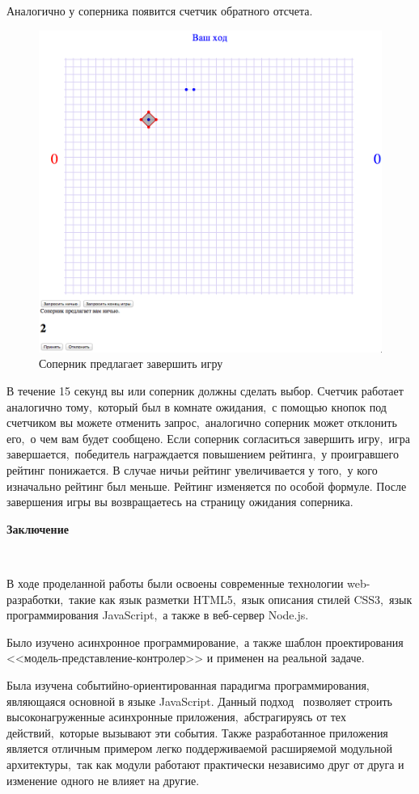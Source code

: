 \documentclass[14pt,a4paper]{report}
\makeatletter
\newcommand{\prechapterheading}[1]{
	\clearpage
	\phantomsection
    \textbf{#1}
    \\
}
\newif\if@prechapterused
\newcommand{\prechapter}[1]{
    \prechapterheading{#1}
    \@prechapterusedtrue
    \addcontentsline{toc}{chapter}{#1}
}
\let\oldchapter\chapter
\renewcommand{\chapter}[1]
{
\if@prechapterused\vspace{-2em}\@prechapterusedfalse\fi
\begingroup
	\let\clearpage\relax
	\let\cleardoublepage\relax
	\oldchapter{#1}
\endgroup
}
\makeatother
\begin{document}
Аналогично у соперника появится счетчик обратного отсчета.
\begin{figure}[H]
\centerline{\includegraphics[scale=0.5]{gfx/17_game_accepting.png}}
\caption{Соперник предлагает завершить игру}
\label{fig:game_accepting}
\end{figure}
В течение 15 секунд вы или соперник должны сделать выбор. Счетчик работает аналогично тому,~который был в комнате ожидания,~с помощью кнопок под счетчиком вы можете отменить запрос,~аналогично соперник может отклонить его,~о чем вам будет сообщено. Если соперник согласиться завершить игру,~игра завершается,~победитель награждается повышением рейтинга,~у проигравшего рейтинг понижается. В случае ничьи рейтинг увеличивается у того,~у кого изначально рейтинг был меньше. Рейтинг изменяется по особой формуле. После завершения игры вы возвращаетесь на страницу ожидания соперника.

\prechapter{Заключение}
~

В ходе проделанной работы были освоены современные технологии web-разработки,~такие как язык разметки HTML5,~язык описания стилей CSS3,~язык программирования JavaScript,~а также в веб-сервер Node.js. 

Было изучено асинхронное программирование,~а также шаблон проектирования <<модель-представление-контролер>> и применен на реальной задаче. 

Была изучена событийно-ориентированная парадигма программирования, являющаяся основной в языке JavaScript. Данный подход ~позволяет строить высоконагруженные асинхронные приложения,~абстрагируясь от тех действий,~которые вызывают эти события. Также разработанное приложения является отличным примером легко поддерживаемой расширяемой модульной архитектуры,~так как модули работают практически независимо друг от друга и изменение одного не влияет на другие.
\end{document}
